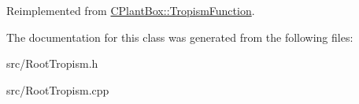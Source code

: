 Reimplemented from \hyperlink{classCPlantBox_1_1TropismFunction_a4f2c79fff55d1398c98a070dd8ebbe08}{C\+Plant\+Box\+::\+Tropism\+Function}.



The documentation for this class was generated from the following files\+:\begin{DoxyCompactItemize}
\item 
src/Root\+Tropism.\+h\item 
src/Root\+Tropism.\+cpp\end{DoxyCompactItemize}
